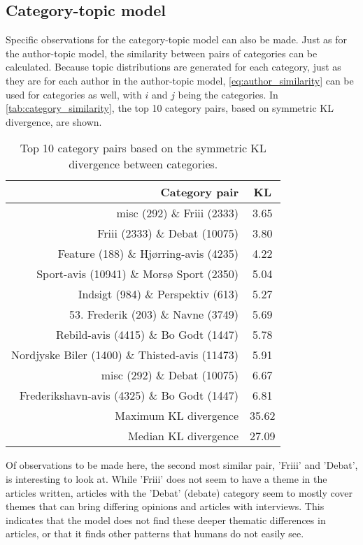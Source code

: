 \subsection{Category-topic model}\label{sec:discussion_category_topic} 
Specific observations for the category-topic model can also be made.
Just as for the author-topic model, the similarity between pairs of categories can be calculated.
Because topic distributions are generated for each category, just as they are for each author in the author-topic model, \autoref{eq:author_similarity} can be used for categories as well, with $i$ and $j$ being the categories.
In \autoref{tab:category_similarity}, the top 10 category pairs, based on symmetric KL divergence, are shown.

\begin{table}[h]
	\centering
	\caption{Top 10 category pairs based on the symmetric KL divergence between categories.}
	\begin{tabular}{r|c}
		Category pair & KL \\
		\midrule
		misc (292) \& Friii (2333) & 3.65 \\
		Friii (2333) \& Debat (10075) & 3.80 \\
		Feature (188) \& Hjørring-avis (4235) & 4.22 \\
		Sport-avis (10941) \& Morsø Sport (2350) & 5.04 \\
		Indsigt (984) \& Perspektiv (613) & 5.27 \\
		53. Frederik (203) \& Navne (3749) & 5.69 \\
		Rebild-avis (4415) \& Bo Godt (1447) & 5.78 \\
		Nordjyske Biler (1400) \& Thisted-avis (11473) & 5.91 \\
		misc (292) \& Debat (10075) & 6.67 \\
		Frederikshavn-avis (4325) \& Bo Godt (1447) & 6.81 \\
		\midrule
		Maximum KL divergence & 35.62 \\
		Median KL divergence & 27.09 \\
	\end{tabular}
	\label{tab:category_similarity}
\end{table}

Of observations to be made here, the second most similar pair, 'Friii' and 'Debat', is interesting to look at. 
While 'Friii' does not seem to have a theme in the articles written, articles with the 'Debat' (debate) category seem to mostly cover themes that can bring differing opinions and articles with interviews.
This indicates that the model does not find these deeper thematic differences in articles, or that it finds other patterns that humans do not easily see.

